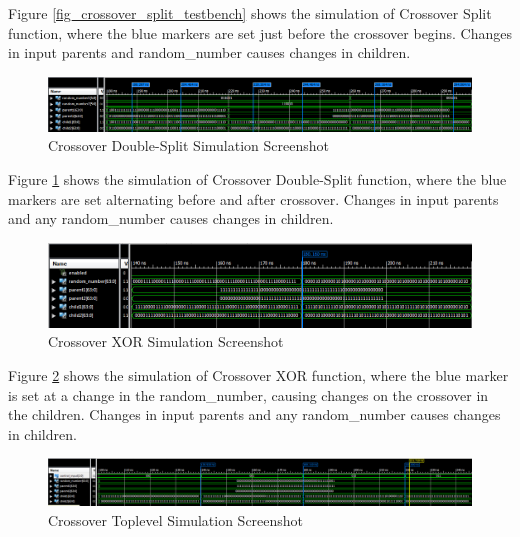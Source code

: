Figure \ref{fig_crossover_split_testbench} shows the simulation of Crossover Split function, where the blue markers are set just before the crossover begins. 
Changes in input parents and random\_number causes changes in children. 

\begin{figure}[H]
\includegraphics[width=\textwidth]{fpga/fig/testbenches/crossover_doublesplit_simulation1.png}
\caption{Crossover Double-Split Simulation Screenshot}
\label{fig_crossover_doublesplit_testbench}
\end{figure}

Figure \ref{fig_crossover_doublesplit_testbench} shows the simulation of Crossover Double-Split function, where the blue markers are set alternating before and after crossover.
Changes in input parents and any random\_number causes changes in children. 

\begin{figure}[H]
\includegraphics[width=\textwidth]{fpga/fig/testbenches/crossover_xor_simulation1.png}
\caption{Crossover XOR Simulation Screenshot}
\label{fig_crossover_xor_testbench}
\end{figure}

Figure \ref{fig_crossover_xor_testbench} shows the simulation of Crossover XOR function, where the blue marker is set at a change in the random\_number, causing changes on the crossover in the children.
Changes in input parents and any random\_number causes changes in children. 

\begin{figure}[H]
\includegraphics[width=\textwidth]{fpga/fig/testbenches/crossover_toplevel_testbench.png}
\caption{Crossover Toplevel Simulation Screenshot}
\label{fig_crossover_toplevel_testbench}
\end{figure}

